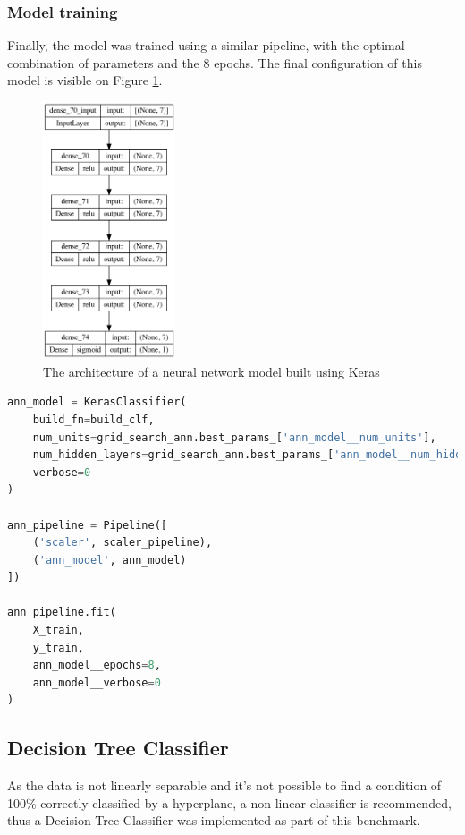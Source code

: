 \documentclass{article}
\begin{document}
\subsubsection{Model training}

Finally, the model was trained using a similar pipeline, with the optimal combination of parameters and the 8 epochs. The final configuration of this model is visible on Figure \ref{fig:nn_plot}.

\begin{figure}
\centering
\includegraphics[width=0.35\textwidth]{nn_plot.png}
\caption{\label{fig:nn_plot}The architecture of a neural network model built using Keras}
\end{figure}

\begin{lstlisting}[language=Python]
ann_model = KerasClassifier(
    build_fn=build_clf,
    num_units=grid_search_ann.best_params_['ann_model__num_units'],
    num_hidden_layers=grid_search_ann.best_params_['ann_model__num_hidden_layers'],
    verbose=0
)

ann_pipeline = Pipeline([
    ('scaler', scaler_pipeline), 
    ('ann_model', ann_model)
])

ann_pipeline.fit(
    X_train, 
    y_train,     
    ann_model__epochs=8, 
    ann_model__verbose=0
)
\end{lstlisting}





\subsection{Decision Tree Classifier}
As the data is not linearly separable and it's not possible to find a condition of 100\% correctly classified by a hyperplane, a non-linear classifier is recommended, thus a Decision Tree Classifier was implemented as part of this benchmark.
\end{document}
